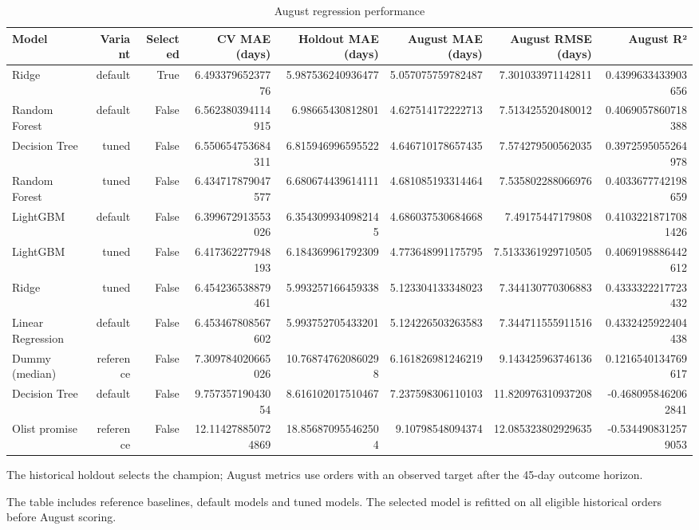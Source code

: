 \begin{table}[htbp]
\centering
\small
\caption{August regression performance}
\begin{tabular}{lrrrrrrr}
\toprule
Model & Variant & Selected & CV MAE (days) & Holdout MAE (days) & August MAE (days) & August RMSE (days) & August R² \\
\midrule
Ridge & default & True & 6.49337965237776 & 5.987536240936477 & 5.057075759782487 & 7.301033971142811 & 0.4399633433903656 \\
Random Forest & default & False & 6.562380394114915 & 6.98665430812801 & 4.627514172222713 & 7.513425520480012 & 0.4069057860718388 \\
Decision Tree & tuned & False & 6.550654753684311 & 6.815946996595522 & 4.646710178657435 & 7.574279500562035 & 0.3972595055264978 \\
Random Forest & tuned & False & 6.434717879047577 & 6.680674439614111 & 4.681085193314464 & 7.535802288066976 & 0.4033677742198659 \\
LightGBM & default & False & 6.399672913553026 & 6.3543099340982145 & 4.686037530684668 & 7.49175447179808 & 0.41032218717081426 \\
LightGBM & tuned & False & 6.417362277948193 & 6.184369961792309 & 4.773648991175795 & 7.5133361929710505 & 0.4069198886442612 \\
Ridge & tuned & False & 6.454236538879461 & 5.993257166459338 & 5.123304133348023 & 7.344130770306883 & 0.4333322217723432 \\
Linear Regression & default & False & 6.453467808567602 & 5.993752705433201 & 5.124226503263583 & 7.344711555911516 & 0.4332425922404438 \\
Dummy (median) & reference & False & 7.309784020665026 & 10.768747620860298 & 6.161826981246219 & 9.143425963746136 & 0.1216540134769617 \\
Decision Tree & default & False & 9.75735719043054 & 8.616102017510467 & 7.237598306110103 & 11.820976310937208 & -0.4680958462062841 \\
Olist promise & reference & False & 12.114278850724869 & 18.856870955462504 & 9.10798548094374 & 12.085323802929635 & -0.5344908312579053 \\
\bottomrule
\end{tabular}
\par\smallskip\begin{minipage}{\linewidth}\footnotesize The historical holdout selects the champion; August metrics use orders with an observed target after the 45-day outcome horizon.\end{minipage}
\end{table}
The table includes reference baselines, default models and tuned models. The selected model is refitted on all eligible historical orders before August scoring.

